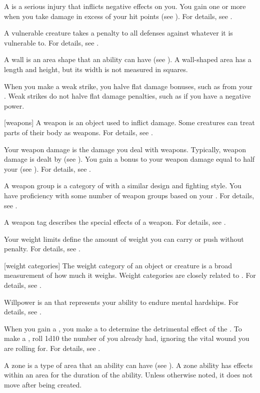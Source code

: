  A  is a serious injury that inflicts negative effects on you.
You gain one or more  when you take damage in excess of your hit points (see ).
For details, see .

 A vulnerable creature takes a  penalty to all defenses against whatever it is vulnerable to.
For details, see .

 A wall is an area shape that an ability can have (see ).
A wall-shaped area has a length and height, but its width is not measured in squares.

 When you make a weak strike, you halve flat damage bonuses, such as from your .
Weak strikes do not halve flat damage penalties, such as if you have a negative power.

[weapons] A weapon is an object used to inflict damage.
Some creatures can treat parts of their body as weapons.
For details, see .

 Your weapon damage is the damage you deal with weapons.
Typically, weapon damage is dealt by  (see ).
You gain a bonus to your weapon damage equal to half your  (see ).
For details, see .

 A weapon group is a category of  with a similar design and fighting style.
You have proficiency with some number of weapon groups based on your .
For details, see .

 A weapon tag describes the special effects of a weapon.
For details, see .

 Your weight limits define the amount of weight you can carry or push without penalty.
For details, see .

[weight categories] The weight category of an object or creature is a broad measurement of how much it weighs.
Weight categories are closely related to .
For details, see .

 Willpower is an  that represents your ability to endure mental hardships.
For details, see .

 When you gain a , you make a  to determine the detrimental effect of the .
To make a , roll 1d10 \sub the number of  you already had, ignoring the vital wound you are rolling for.
For details, see .

 A zone is a type of area that an ability can have (see ).
A zone ability has effects within an area for the duration of the ability.
Unless otherwise noted, it does not move after being created.
